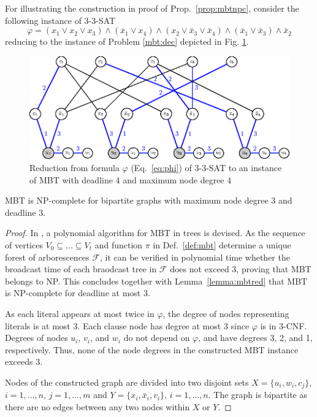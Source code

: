 For illustrating the construction in proof of Prop.~\ref{prop:mbtnpc}, consider the following instance of \textsc{3-3-SAT}
\begin{equation}
\varphi=(x_1\vee x_2\vee x_3)\wedge(\bar{x}_1\vee x_4)\wedge(x_2\vee \bar{x}_3 \vee\bar{x}_4)\wedge(\bar{x}_1\vee \bar{x}_3)\wedge \bar{x}_2 
\label{eq:phi}
\end{equation}
reducing to the instance of Problem \ref{mbt:dec} depicted in Fig. \ref{fig:mbtnpc}.
\begin{figure}
\centering
\includegraphics{figurer/mbtnpc.eps}
\caption{Reduction from formula $\varphi$ (Eq.~\eqref{eq:phi}) of \textsc{3-3-SAT} to an instance of MBT with deadline 4 and maximum node degree 4}
\label{fig:mbtnpc}
\end{figure}

\begin{proposition}
MBT is NP-complete for bipartite graphs with maximum node degree 3 and deadline 3.
\end{proposition}
\begin{proof}
In \cite{slater81}, a polynomial algorithm for MBT in trees is devised.
As the sequence of vertices $V_0\subseteq\dots\subseteq V_t$ and function $\pi$ in Def.~\ref{def:mbt} determine a unique forest of arborescences $\mathcal{F}$,
it can be verified in polynomial time whether the broadcast time of each braodcast tree in $\mathcal{F}$ does not exceed 3, proving that MBT belongs to NP.
This concludes together with Lemma~\ref{lemma:mbtred} that MBT is NP-complete for deadline at most 3.

As each literal appears at most twice in $\varphi$, the degree of nodes representing literals is at most 3. 
Each clause node has degree at most 3 since $\varphi$ is in 3-CNF.
Degrees of nodes $u_i$, $v_i$, and $w_i$ do not depend on $\varphi$, and have degrees 3, 2, and 1, respectively.
Thus, none of the node degrees in the constructed MBT instance exceeds 3.

Nodes of the constructed graph are divided into two disjoint sets $X=\{u_i,w_i,c_j\}$, $i=1,\dots,n$, $j=1,\dots,m$ and $Y=\{x_i,\bar{x}_i,v_i\}$, $i=1,\dots,n$.
The graph is bipartite as there are no edges between any two nodes within $X$ or $Y$.
\end{proof}

